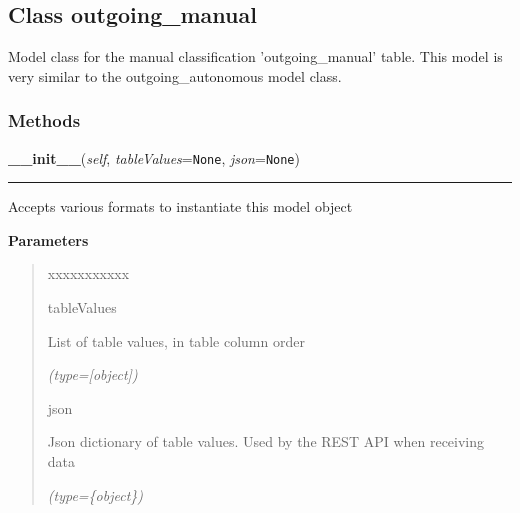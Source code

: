 \subsection{Class outgoing\_manual}

    \label{src:dao:model:outgoing_manual:outgoing_manual}
Model class for the manual classification 'outgoing\_manual' table. This 
model is very similar to the outgoing\_autonomous model class.



  \subsubsection{Methods}

    \label{src:dao:model:outgoing_manual:outgoing_manual:__init__}

    \vspace{0.5ex}

\hspace{.8\funcindent}\begin{boxedminipage}{\funcwidth}

    \raggedright \textbf{\_\_init\_\_}(\textit{self}, \textit{tableValues}={\tt None}, \textit{json}={\tt None})

    \vspace{-1.5ex}

    \rule{\textwidth}{0.5\fboxrule}
\setlength{\parskip}{2ex}
    Accepts various formats to instantiate this model object

\setlength{\parskip}{1ex}
      \textbf{Parameters}
      \vspace{-1ex}

      \begin{quote}
        \begin{Ventry}{xxxxxxxxxxx}

          \item[tableValues]

          List of table values, in table column order

            {\it (type=[object])}

          \item[json]

          Json dictionary of table values. Used by the REST API when 
          receiving data

            {\it (type=\{object\})}

        \end{Ventry}

      \end{quote}

    \end{boxedminipage}

